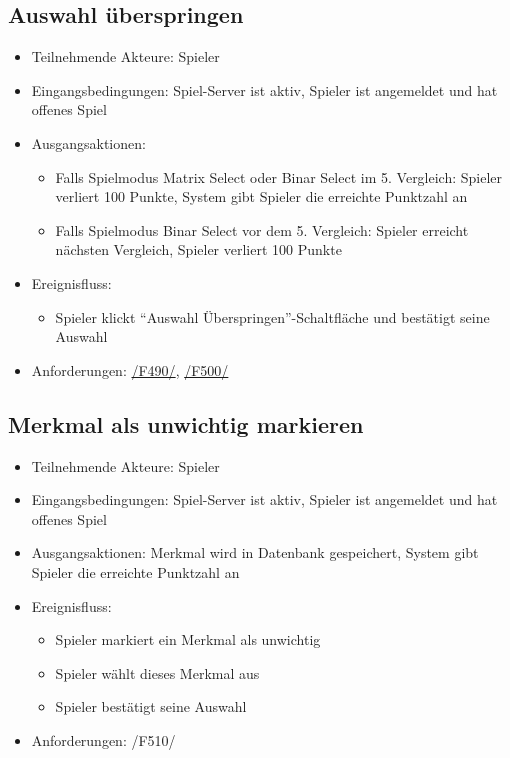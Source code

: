 \documentclass[a4paper]{scrreprt}
\begin{document}
	\subsection{Auswahl überspringen}
	\begin{itemize}
		\item Teilnehmende Akteure: \Gls{Spieler}
		\item Eingangsbedingungen: \Gls{Spiel-Server} ist aktiv, \Gls{Spieler} ist angemeldet und hat offenes Spiel
        \item Ausgangsaktionen: \begin{itemize}
					\item Falls Spielmodus \Gls{Matrix Select} oder \Gls{Binar Select} im 5. Vergleich: Spieler verliert 100 Punkte, System gibt \Gls{Spieler} die erreichte Punktzahl an
					\item Falls Spielmodus \Gls{Binar Select} vor dem 5. Vergleich: Spieler erreicht nächsten Vergleich, Spieler verliert 100 Punkte
                    \end{itemize}
		\item Ereignisfluss:
		\begin{itemize}
			\item \Gls{Spieler} klickt \enquote{Auswahl Überspringen}-Schaltfläche und bestätigt seine Auswahl
		\end{itemize}
        \item Anforderungen: \hyperlink{F490}{/F490/}, \hyperlink{F500}{/F500/}
	\end{itemize}

	\subsection{Merkmal als unwichtig markieren}
	\begin{itemize}
		\item Teilnehmende Akteure: \Gls{Spieler}
		\item Eingangsbedingungen: \Gls{Spiel-Server} ist aktiv, \Gls{Spieler} ist angemeldet und hat offenes Spiel
		\item Ausgangsaktionen: \Gls{Merkmal} wird in Datenbank gespeichert, System gibt \Gls{Spieler} die erreichte Punktzahl an
		\item Ereignisfluss:
		\begin{itemize}
			\item \Gls{Spieler} markiert ein \Gls{Merkmal} als unwichtig
			\item \Gls{Spieler} wählt dieses \Gls{Merkmal} aus
			\item \Gls{Spieler} bestätigt seine Auswahl
		\end{itemize}
		\item Anforderungen: /F510/
	\end{itemize}
     
\end{document}
